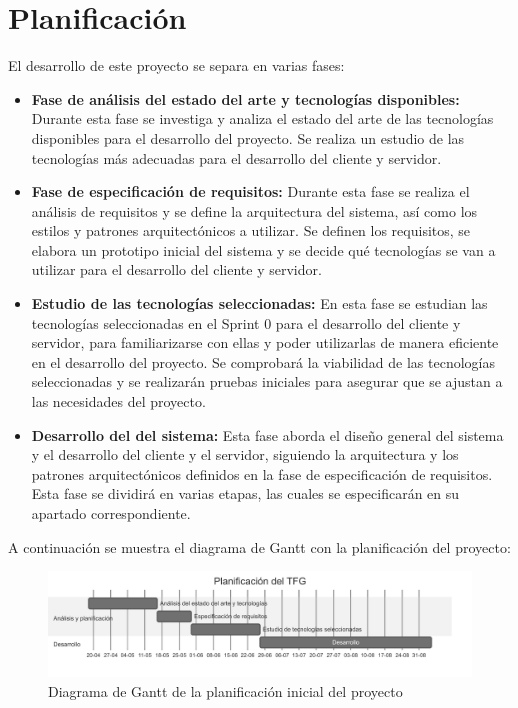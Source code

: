 \section{Planificación}
El desarrollo de este proyecto se separa en varias fases:
\begin{itemize}
    \item \textbf{Fase de análisis del estado del arte y tecnologías disponibles:} Durante esta fase se investiga y analiza el estado del arte de las tecnologías disponibles para el desarrollo del proyecto. Se realiza un estudio de las tecnologías más adecuadas para el desarrollo del cliente y servidor.
    \item \textbf{Fase de especificación de requisitos:} Durante esta fase se realiza el análisis de requisitos y se define la arquitectura del sistema, así como los estilos y patrones arquitectónicos a utilizar. Se definen los requisitos, se elabora un prototipo inicial del sistema y se decide qué tecnologías se van a utilizar para el desarrollo del cliente y servidor.
    \item \textbf{Estudio de las tecnologías seleccionadas:} En esta fase se estudian las tecnologías seleccionadas en el Sprint 0 para el desarrollo del cliente y servidor, para familiarizarse con ellas y poder utilizarlas de manera eficiente en el desarrollo del proyecto. Se comprobará la viabilidad de las tecnologías seleccionadas y se realizarán pruebas iniciales para asegurar que se ajustan a las necesidades del proyecto.
    \item \textbf{Desarrollo del del sistema:} Esta fase aborda el diseño general del sistema y el desarrollo del cliente y el servidor, siguiendo la arquitectura y los patrones arquitectónicos definidos en la fase de especificación de requisitos. Esta fase se dividirá en varias etapas, las cuales se especificarán en su apartado correspondiente.
\end{itemize}

A continuación se muestra el diagrama de Gantt con la planificación del proyecto:
\begin{figure}[H]
    \begin{center}
        \includegraphics[width=\textwidth]{assets/planificacion-inicial.png}
    \end{center}
    \caption{Diagrama de Gantt de la planificación inicial del proyecto}\label{fig:planificacion-inicial}
\end{figure}


